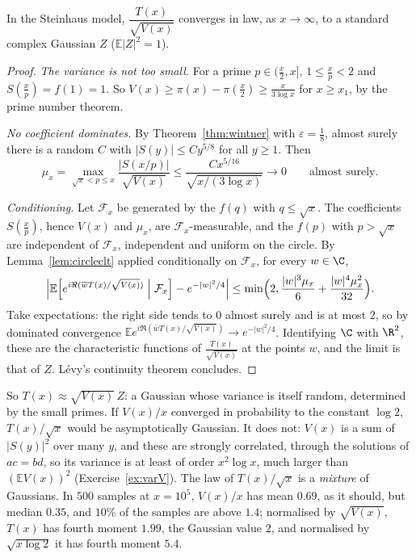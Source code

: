\begin{theorem}\label{thm:condclt}
In the Steinhaus model, $\dfrac{T(x)}{\sqrt{V(x)}}$ converges in law, as $x\to\infty$, to a standard complex Gaussian $Z$ ($\mathbb E|Z|^2=1$).
\end{theorem}
\begin{proof}
\emph{The variance is not too small.} For a prime $p\in(\frac x2,x]$, $1\le\frac xp<2$ and $S(\frac xp)=f(1)=1$. So $V(x)\ge\pi(x)-\pi(\frac x2)\ge\frac x{3\log x}$ for $x\ge x_1$, by the prime number theorem.

\emph{No coefficient dominates.} By Theorem~\ref{thm:wintner} with $\varepsilon=\frac18$, almost surely there is a random $C$ with $|S(y)|\le Cy^{5/8}$ for all $y\ge1$. Then
\[
\mu_x=\max_{\sqrt x<p\le x}\frac{|S(x/p)|}{\sqrt{V(x)}}\le\frac{Cx^{5/16}}{\sqrt{x/(3\log x)}}\longrightarrow0\qquad\text{almost surely.}
\]

\emph{Conditioning.} Let $\mathcal F_x$ be generated by the $f(q)$ with $q\le\sqrt x$. The coefficients $S(\frac xp)$, hence $V(x)$ and $\mu_x$, are $\mathcal F_x$-measurable, and the $f(p)$ with $p>\sqrt x$ are independent of $\mathcal F_x$, independent and uniform on the circle. By Lemma~\ref{lem:circleclt} applied conditionally on $\mathcal F_x$, for every $w\in\C$,
\[
\Bigl|\mathbb E\Bigl[e^{i\Re(\overline wT(x)/\sqrt{V(x)})}\Bigm|\mathcal F_x\Bigr]-e^{-|w|^2/4}\Bigr|\le\min\Bigl(2,\frac{|w|^3\mu_x}6+\frac{|w|^4\mu_x^2}{32}\Bigr).
\]
Take expectations: the right side tends to $0$ almost surely and is at most $2$, so by dominated convergence $\mathbb Ee^{i\Re(\overline wT(x)/\sqrt{V(x)})}\to e^{-|w|^2/4}$. Identifying $\C$ with $\R^2$, these are the characteristic functions of $\frac{T(x)}{\sqrt{V(x)}}$ at the points $w$, and the limit is that of $Z$. Lévy's continuity theorem concludes.
\end{proof}

So $T(x)\approx\sqrt{V(x)}\,Z$: a Gaussian whose variance is itself random, determined by the small primes. If $V(x)/x$ converged in probability to the constant $\log2$, $T(x)/\sqrt x$ would be asymptotically Gaussian. It does not: $V(x)$ is a sum of $|S(y)|^2$ over many $y$, and these are strongly correlated, through the solutions of $ac=bd$, so its variance is at least of order $x^2\log x$, much larger than $(\mathbb EV(x))^2$ (Exercise~\ref{ex:varV}). The law of $T(x)/\sqrt x$ is a \emph{mixture} of Gaussians. In $500$ samples at $x=10^5$, $V(x)/x$ has mean $0.69$, as it should, but median $0.35$, and $10\%$ of the samples are above $1.4$; normalised by $\sqrt{V(x)}$, $T(x)$ has fourth moment $1.99$, the Gaussian value $2$, and normalised by $\sqrt{x\log2}$ it has fourth moment $5.4$.

